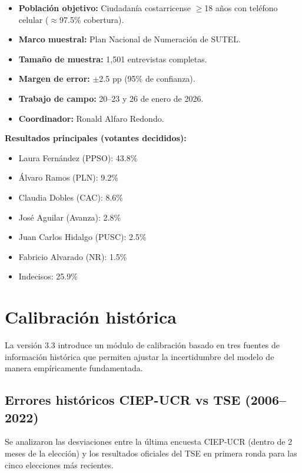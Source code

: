 \documentclass[11pt,a4paper]{article}
\begin{document}
\begin{itemize}[noitemsep]
    \item \textbf{Población objetivo:} Ciudadanía costarricense $\geq$18 años con teléfono celular ($\approx$97.5\% cobertura).
    \item \textbf{Marco muestral:} Plan Nacional de Numeración de SUTEL.
    \item \textbf{Tamaño de muestra:} 1,501 entrevistas completas.
    \item \textbf{Margen de error:} $\pm$2.5 pp (95\% de confianza).
    \item \textbf{Trabajo de campo:} 20--23 y 26 de enero de 2026.
    \item \textbf{Coordinador:} Ronald Alfaro Redondo.
\end{itemize}

\textbf{Resultados principales (votantes decididos):}
\begin{itemize}[noitemsep]
    \item Laura Fernández (PPSO): 43.8\%
    \item Álvaro Ramos (PLN): 9.2\%
    \item Claudia Dobles (CAC): 8.6\%
    \item José Aguilar (Avanza): 2.8\%
    \item Juan Carlos Hidalgo (PUSC): 2.5\%
    \item Fabricio Alvarado (NR): 1.5\%
    \item Indecisos: 25.9\%
\end{itemize}

\section{Calibración histórica}

La versión 3.3 introduce un módulo de calibración basado en tres fuentes de información histórica que permiten ajustar la incertidumbre del modelo de manera empíricamente fundamentada.

\subsection{Errores históricos CIEP-UCR vs TSE (2006--2022)}

Se analizaron las desviaciones entre la última encuesta CIEP-UCR (dentro de 2 meses de la elección) y los resultados oficiales del TSE en primera ronda para las cinco elecciones más recientes.
\end{document}
